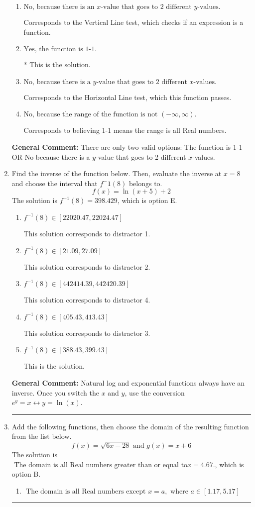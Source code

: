 \documentclass{extbook}[14pt]
\newcommand{\litem}[1]{\item #1

\rule{\textwidth}{0.4pt}}
\begin{document}
\begin{enumerate}
{\begin{enumerate}[label=\Alph*.]
Corresponds to believing 1-1 means the domain is all Real numbers.
\item \( \text{No, because there is an $x$-value that goes to 2 different $y$-values.} \)

Corresponds to the Vertical Line test, which checks if an expression is a function.
\item \( \text{Yes, the function is 1-1.} \)

* This is the solution.
\item \( \text{No, because there is a $y$-value that goes to 2 different $x$-values.} \)

Corresponds to the Horizontal Line test, which this function passes.
\item \( \text{No, because the range of the function is not $(-\infty, \infty)$.} \)

Corresponds to believing 1-1 means the range is all Real numbers.
\end{enumerate}

\textbf{General Comment:} There are only two valid options: The function is 1-1 OR No because there is a $y$-value that goes to 2 different $x$-values.
}
\litem{
Find the inverse of the function below. Then, evaluate the inverse at $x = 8$ and choose the interval that $f^-1(8)$ belongs to.
\[ f(x) = \ln{(x+5)}+2 \]The solution is \( f^{-1}(8) = 398.429 \), which is option E.\begin{enumerate}[label=\Alph*.]
\item \( f^{-1}(8) \in [22020.47, 22024.47] \)

 This solution corresponds to distractor 1.
\item \( f^{-1}(8) \in [21.09, 27.09] \)

 This solution corresponds to distractor 2.
\item \( f^{-1}(8) \in [442414.39, 442420.39] \)

 This solution corresponds to distractor 4.
\item \( f^{-1}(8) \in [405.43, 413.43] \)

 This solution corresponds to distractor 3.
\item \( f^{-1}(8) \in [388.43, 399.43] \)

 This is the solution.
\end{enumerate}

\textbf{General Comment:} Natural log and exponential functions always have an inverse. Once you switch the $x$ and $y$, use the conversion $ e^y = x \leftrightarrow y=\ln(x)$.
}
\litem{
Add the following functions, then choose the domain of the resulting function from the list below.
\[ f(x) = \sqrt{6x-28}  \text{ and } g(x) = x + 6 \]The solution is \( \text{ The domain is all Real numbers greater than or equal to} x = 4.67. \), which is option B.\begin{enumerate}[label=\Alph*.]
\item \( \text{ The domain is all Real numbers except } x = a, \text{ where } a \in [1.17, 5.17] \)



\end{enumerate}}
\end{enumerate}
\end{document}
